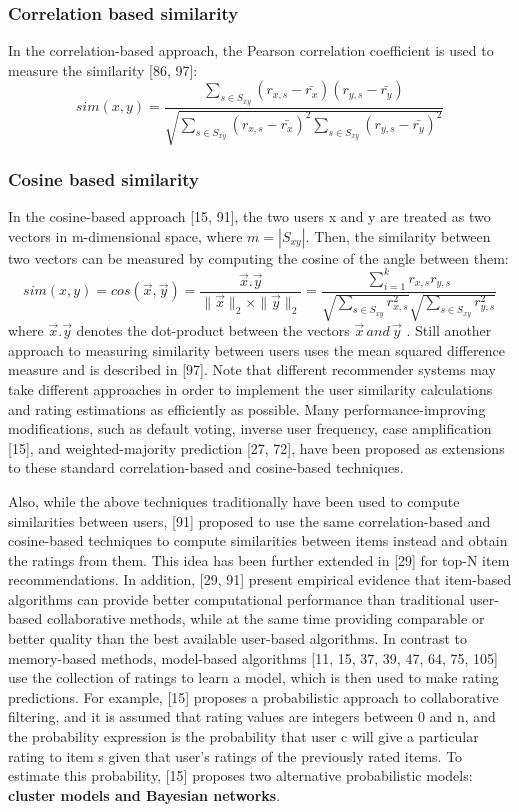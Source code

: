 \subsubsection{Correlation based similarity}
In the correlation-based approach, the Pearson correlation coefficient is used to measure the similarity [86, 97]:
\begin{equation}\label{eq:12}
sim(x,y)= \frac {\sum_{s\in S_{xy}}(r_{x,s}-\bar{r_x})(r_{y,s}- \bar{r_y})}{\sqrt{\sum_{s \in S_{xy}}(r_{x,s}-\bar{r_x})^2 \sum_{s\in S_{xy}}(r_{y,s}- \bar{r_y})^2}}
\end{equation}
\subsubsection{Cosine based similarity}
In the cosine-based approach [15, 91], the two users x and y are treated as two vectors in m-dimensional space, where $m=|S_{xy} |$. Then, the similarity between two vectors can be measured by computing the cosine of the angle between them:
\begin{equation}\label{eq:13}
sim(x,y)= cos(\vec{x}  ,\vec {y}) = \frac{\vec{x} . \vec {y}} {\|\vec{x}\|_2 \times \|\vec{y}\|_2 } = 
\frac{\sum _{i=1}^{k}r_{x,s}r_{y,s} }{\sqrt {\sum_{s\in S_{xy}}r^{2}_{x,s}}{\sqrt {\sum_{s\in S_{xy}}r^{2}_{y,s}}}}
\end{equation}
where $\vec{x} . \vec {y}$  denotes the dot-product between the vectors $\vec{x} \,and \,\vec {y}$ . Still another approach  to measuring similarity between users uses the mean squared difference measure and is described in [97]. Note that different recommender systems may take different approaches in order to implement the user similarity calculations and rating estimations as efficiently as possible.
Many performance-improving modifications, such as default voting, inverse user frequency, case amplification [15], and weighted-majority prediction [27, 72], have been proposed as extensions to these standard correlation-based and cosine-based techniques.


Also, while the above techniques traditionally have been used to compute similarities between users, [91] proposed to use the same correlation-based and cosine-based techniques to compute similarities between items instead and obtain the ratings from them. This idea has been further extended in [29] for top-N item recommendations. In addition, [29, 91] present empirical evidence that item-based algorithms can provide better computational performance than traditional user-based collaborative methods, while at the same time providing comparable or better quality than the best available user-based algorithms.
In contrast to memory-based methods, model-based algorithms [11, 15, 37, 39, 47, 64, 75, 105] use the collection of ratings to learn a model, which is then used to make rating predictions. For example, [15] proposes a probabilistic approach to collaborative filtering, and it is assumed that rating values are integers between 0 and n, and the probability expression is the probability that user c will give a particular rating to item s given that user’s ratings of the previously rated items. To estimate this probability, [15] proposes two alternative probabilistic models: \textbf{cluster models and Bayesian networks}.

